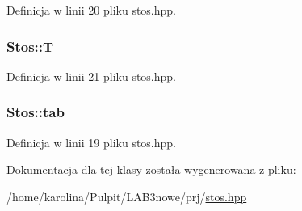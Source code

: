 Definicja w linii 20 pliku stos.\-hpp.

\hypertarget{class_stos_a62fd3591c5613480c3c770d90f7b91b1}{
\subsubsection[{T}]{ Stos\-::\-T\hspace{0.3cm}{\ttfamily [private]}}}\label{class_stos_a62fd3591c5613480c3c770d90f7b91b1}


Definicja w linii 21 pliku stos.\-hpp.

\hypertarget{class_stos_a0cdca9595d13e2563eb3e0230ecf7619}{
\subsubsection[{tab}]{ Stos\-::tab\hspace{0.3cm}{\ttfamily [private]}}}\label{class_stos_a0cdca9595d13e2563eb3e0230ecf7619}


Definicja w linii 19 pliku stos.\-hpp.



Dokumentacja dla tej klasy została wygenerowana z pliku\-:\begin{DoxyCompactItemize}
\item 
/home/karolina/\-Pulpit/\-L\-A\-B3nowe/prj/\hyperlink{stos_8hpp}{stos.\-hpp}\end{DoxyCompactItemize}
